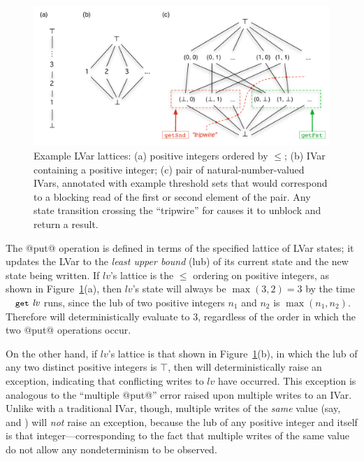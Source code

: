 \begin{figure}
\centering
\includegraphics[width=5in]{chapter2/figures/lvars-example-lattices.pdf} 
  \caption{Example LVar lattices: (a) positive integers ordered by
    $\leq$; (b) IVar containing a positive integer; (c) pair of
    natural-number-valued IVars, annotated with example threshold sets
    that would correspond to a blocking read of the first or second
    element of the pair.  Any state transition crossing the
    ``tripwire'' for  causes it to unblock and return
    a result.}
  \label{f:lvars-example-lattices}
\end{figure}

The @put@ operation is
defined in terms of the specified lattice of LVar states; it
updates the LVar to the \emph{least upper bound} (lub) of its
current state and the new state being written.
If $\mathit{lv}$'s lattice is the $\leq$ ordering on positive
integers, as shown in Figure~\ref{f:lvars-example-lattices}(a), then
$\mathit{lv}$'s state will always be $\max(3, 2) = 3$ by the time
$\GET~\mathit{lv}$ runs, since the lub of two positive integers $n_1$
and $n_2$ is $\max(n_1, n_2)$.  Therefore  will
deterministically evaluate to $3$, regardless of the order in which
the two @put@ operations occur.

On the other hand, if $\mathit{lv}$'s lattice is that shown in
Figure~\ref{f:lvars-example-lattices}(b), in which the lub of any two
distinct positive integers is $\top$, then  will
deterministically raise an exception, indicating that conflicting
writes to $\mathit{lv}$ have occurred.  This exception is analogous to
the ``multiple @put@'' error raised upon multiple writes to an IVar.
Unlike with a traditional IVar, though, multiple writes of the
\emph{same} value (say,  and
) will \emph{not} raise an exception, because
the lub of any positive integer and itself is that
integer---corresponding to the fact that multiple writes of the same
value do not allow any nondeterminism to be observed.

